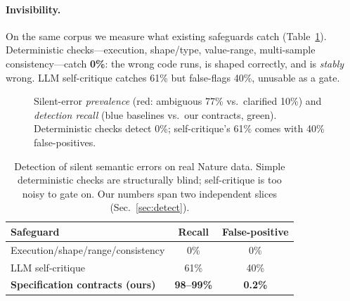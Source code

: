 \documentclass[10pt,twocolumn,letterpaper]{article}
\begin{document}
\paragraph{Invisibility.} On the same corpus we measure what existing safeguards
catch (Table~\ref{tab:baselines}). Deterministic checks---execution, shape/type,
value-range, multi-sample consistency---catch \textbf{0\%}: the wrong code runs,
is shaped correctly, and is \emph{stably} wrong. LLM self-critique catches 61\%
but false-flags 40\%, unusable as a gate.

\begin{figure}[t]\centering
{}
\caption{Silent-error \emph{prevalence} (red: ambiguous 77\% vs.\ clarified
10\%) and \emph{detection recall} (blue baselines vs.\ our contracts, green).
Deterministic checks detect 0\%; self-critique's 61\% comes with 40\%
false-positives.}
\label{fig:prev}
\end{figure}

\begin{table}[t]\centering\small
\setlength{\tabcolsep}{4.5pt}
\begin{tabular}{@{}lcc@{}}
\toprule
Safeguard & Recall & False-positive\\
\midrule
Execution/shape/range/consistency & 0\% & 0\%\\
LLM self-critique & 61\% & 40\%\\
\textbf{Specification contracts (ours)} & \textbf{98--99\%} & \textbf{0.2\%}\\
\bottomrule
\end{tabular}
\caption{Detection of silent semantic errors on real Nature data. Simple
deterministic checks are structurally blind; self-critique is too noisy to gate
on. Our numbers span two independent slices (Sec.~\ref{sec:detect}).}
\label{tab:baselines}
\end{table}
\end{document}
